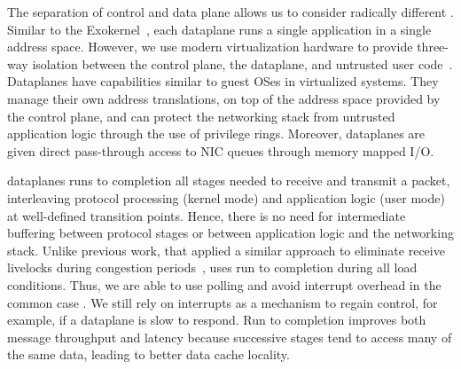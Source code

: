 The separation of control and data plane allows us to consider
radically different .  
Similar to the Exokernel~\cite{DBLP:conf/sosp/EnglerKO95}, each
dataplane runs a single application in a single address
space. However, we use modern virtualization hardware to provide
three-way isolation between the control plane, the dataplane, and
untrusted user code~\cite{dune}. Dataplanes have capabilities similar
to guest OSes in virtualized systems. They manage their own address
translations, on top of the address space provided by the control
plane, and can protect the networking stack from untrusted application
logic through the use of privilege rings. Moreover, dataplanes are
given direct pass-through access to NIC queues through memory mapped
I/O.



 \ix dataplanes
runs to completion all stages needed to receive and transmit a packet,
interleaving protocol processing (kernel mode) and application logic
(user mode) at well-defined transition points. Hence, there is no need
for intermediate buffering between protocol stages or between
application logic and the networking stack.  Unlike previous work, that
applied a similar approach to eliminate receive livelocks during
congestion periods~\cite{receive-livelock}, \ix uses run to completion
during all load conditions. Thus, we are able to use polling and avoid
interrupt overhead in the common case . We still rely on interrupts as
a mechanism to regain control, for example, if a dataplane is slow to
respond.  Run to completion improves both message throughput and
latency because successive stages tend to access many of the same
data, leading to better data cache locality.

